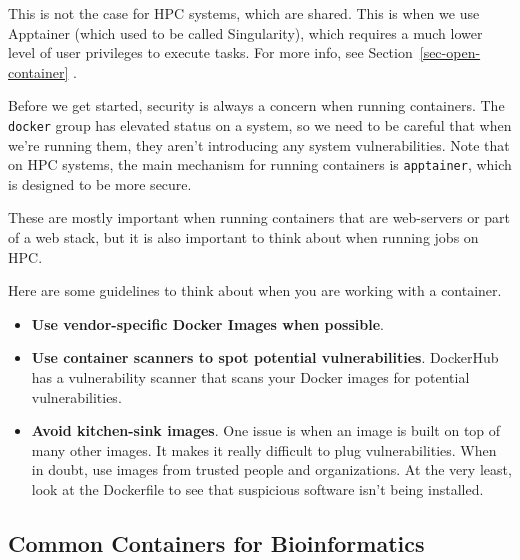 \documentclass[
  letterpaper,
  DIV=11,
  numbers=noendperiod]{scrreprt}
\providecommand{\tightlist}{%
  \setlength{\itemsep}{0pt}\setlength{\parskip}{0pt}}
\begin{document}
This is not the case for HPC systems, which are shared. This is when we
use Apptainer (which used to be called Singularity), which requires a
much lower level of user privileges to execute tasks. For more info, see
Section~\ref{sec-open-container} .

\begin{tcolorbox}[enhanced jigsaw, colbacktitle=quarto-callout-warning-color!10!white, left=2mm, toprule=.15mm, toptitle=1mm, opacityback=0, bottomrule=.15mm, breakable, leftrule=.75mm, colframe=quarto-callout-warning-color-frame, bottomtitle=1mm, titlerule=0mm, coltitle=black, title=\textcolor{quarto-callout-warning-color}{\faExclamationTriangle}\hspace{0.5em}{Be Secure}, rightrule=.15mm, arc=.35mm, opacitybacktitle=0.6, colback=white]

Before we get started, security is always a concern when running
containers. The \texttt{docker} group has elevated status on a system,
so we need to be careful that when we're running them, they aren't
introducing any system vulnerabilities. Note that on HPC systems, the
main mechanism for running containers is \texttt{apptainer}, which is
designed to be more secure.

These are mostly important when running containers that are web-servers
or part of a web stack, but it is also important to think about when
running jobs on HPC.

Here are some guidelines to think about when you are working with a
container.

\begin{itemize}
\tightlist
\item
  \textbf{Use vendor-specific Docker Images when possible}.
\item
  \textbf{Use container scanners to spot potential vulnerabilities}.
  DockerHub has a vulnerability scanner that scans your Docker images
  for potential vulnerabilities.
\item
  \textbf{Avoid kitchen-sink images}. One issue is when an image is
  built on top of many other images. It makes it really difficult to
  plug vulnerabilities. When in doubt, use images from trusted people
  and organizations. At the very least, look at the Dockerfile to see
  that suspicious software isn't being installed.
\end{itemize}

\end{tcolorbox}

\subsection{Common Containers for
Bioinformatics}\label{common-containers-for-bioinformatics}
\end{document}
